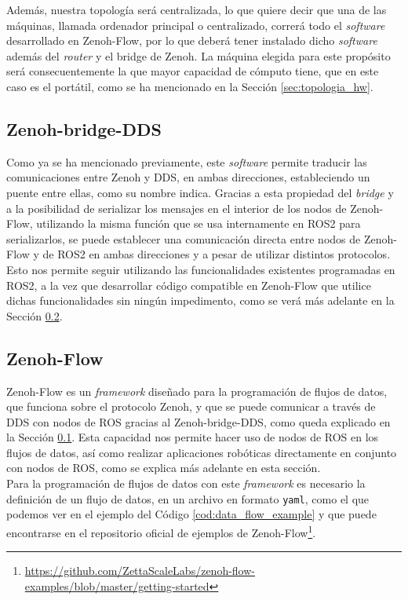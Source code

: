 Además, nuestra topología será centralizada, lo que quiere decir que una de las
máquinas, llamada ordenador principal o centralizado, correrá todo el
\textit{software} desarrollado en Zenoh-Flow, por lo que deberá tener instalado
dicho \textit{software} además del \textit{router} y el bridge de Zenoh.
La máquina elegida para este propósito será consecuentemente la que mayor
capacidad de cómputo tiene, que en este caso es el portátil, como se ha
mencionado en la Sección \ref{sec:topologia_hw}.


\subsection{Zenoh-bridge-DDS}
\label{sec:zenoh_bridge}

Como ya se ha mencionado previamente, este \textit{software} permite traducir
las comunicaciones entre Zenoh y DDS, en ambas direcciones, estableciendo un
puente entre ellas, como su nombre indica.
Gracias a esta propiedad del \textit{bridge} y a la posibilidad de serializar
los mensajes en el interior de los nodos de Zenoh-Flow, utilizando la misma
función que se usa internamente en ROS2 para serializarlos, se puede establecer
una comunicación directa entre nodos de Zenoh-Flow y de ROS2 en ambas
direcciones y a pesar de utilizar distintos protocolos.
\\

Esto nos permite seguir utilizando las funcionalidades existentes programadas
en ROS2, a la vez que desarrollar código compatible en Zenoh-Flow que utilice
dichas funcionalidades sin ningún impedimento, como se verá más adelante en la
Sección \ref{sec:zenoh_flow}.
\\


\subsection{Zenoh-Flow}
\label{sec:zenoh_flow}

Zenoh-Flow es un \textit{framework} diseñado para la programación de flujos de
datos, que funciona sobre el protocolo Zenoh, y que se puede comunicar a través
de DDS con nodos de ROS gracias al Zenoh-bridge-DDS, como queda explicado en la
Sección \ref{sec:zenoh_bridge}.
Esta capacidad nos permite hacer uso de nodos de ROS en los flujos de datos, así
como realizar aplicaciones robóticas directamente en conjunto con nodos de ROS,
como se explica más adelante en esta sección.
\\

Para la programación de flujos de datos con este \textit{framework} es necesario
la definición de un flujo de datos, en un archivo en formato \texttt{yaml}, como
el que podemos ver en el ejemplo del Código \ref{cod:data_flow_example} y que
puede encontrarse en el repositorio oficial de ejemplos de Zenoh-Flow\footnote{
\href{https://github.com/ZettaScaleLabs/zenoh-flow-examples/blob/master/getting-started}{https://github.com/ZettaScaleLabs/zenoh-flow-examples/blob/master/getting-started}}.
\\

